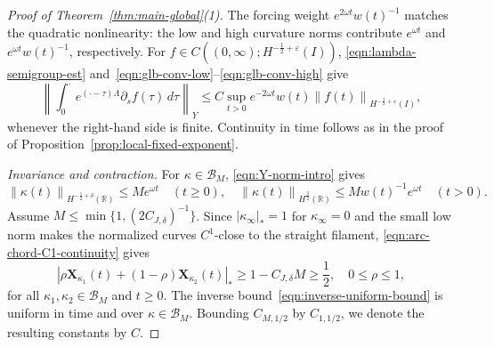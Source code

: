\documentclass[11pt,reqno]{amsart}
\theoremstyle{plain}
\theoremstyle{definition}
\numberwithin{equation}{section}
\newcommand{\p}{\partial}
\newcommand{\mc}[1]{\mathcal{#1}}
\newcommand{\bm}[1]{\boldsymbol{#1}}
\newcommand{\abs}[1]{\left\lvert #1 \right\rvert}
\newcommand{\norm}[1]{\left\lVert #1 \right\rVert}
\newcommand{\R}{\mathbb{R}}
\newcommand{\xka}[1]{\bm X_{\kappa_{#1}}}
\newcommand{\hi}[1]{H^{#1}(I)}
\newcommand{\hr}[1]{H^{#1}(\R)}
\begin{document}
\begin{proof}[Proof of Theorem~\ref{thm:main-global}(1)]
The forcing weight $e^{2\omega t}w(t)^{-1}$ matches the quadratic
nonlinearity: the low and high curvature norms contribute
$e^{\omega t}$ and $e^{\omega t}w(t)^{-1}$, respectively.
For $f\in C((0,\infty);\hi{-\frac12+\varepsilon})$,
\eqref{eqn:lambda-semigroup-est} and~\eqref{eqn:glb-conv-low}--\eqref{eqn:glb-conv-high} give
\begin{equation}\label{eqn:global-duhamel-est}
    \norm{\int_0^\cdot e^{(\cdot-\tau)\Lambda}\p_s f(\tau)\,d\tau}_Y
    \le C\sup_{t>0}e^{-2\omega t}w(t)
        \norm{f(t)}_{\hi{-\frac12+\varepsilon}},
\end{equation}
whenever the right-hand side is finite. Continuity in time follows as in the
proof of Proposition~\ref{prop:local-fixed-exponent}.

\emph{Invariance and contraction.}
For $\kappa\in\mc B_M$, \eqref{eqn:Y-norm-intro} gives
\begin{equation}
    \norm{\kappa(t)}_{\hr{-\frac12+\delta}}\le Me^{\omega t}\quad(t\ge0),
    \quad
    \norm{\kappa(t)}_{\hr{\frac32}}\le Mw(t)^{-1}e^{\omega t}\quad(t>0).
\end{equation}
Assume $M\le\min\{1,(2C_{J,\delta})^{-1}\}$. Since
$\abs{\kappa_\infty}_*=1$ for $\kappa_\infty=0$ and the small low norm
makes the normalized curves $C^1$-close to the straight filament,
\eqref{eqn:arc-chord-C1-continuity} gives
\begin{equation}\label{eqn:global-ball-geometry}
    \abs{\rho\xka{1}(t)+(1-\rho)\xka{2}(t)}_*
    \ge1-C_{J,\delta}M\ge\frac12,
    \quad 0\le\rho\le1,
\end{equation}
for all $\kappa_1,\kappa_2\in\mc B_M$ and $t\ge0$.
The inverse bound~\eqref{eqn:inverse-uniform-bound} is uniform in time
and over $\kappa\in\mc B_M$. Bounding $C_{M,1/2}$ by $C_{1,1/2}$,
we denote the resulting constants by $C$.


\end{proof}
\end{document}
